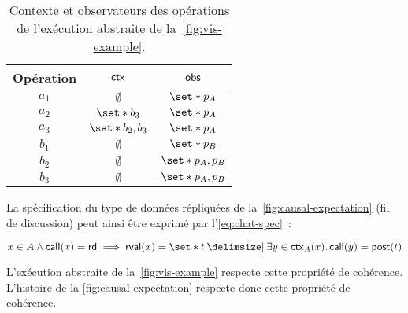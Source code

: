 \begin{table}[htb]
    \centering
    \begin{tabular}{ccc}
        Opération & $\operatorname{\mathsf{ctx}}$ & $\operatorname{\mathsf{obs}}$ \\
        \toprule
        $a_1$ & $\emptyset$ & $\set*{p_A}$ \\
        $a_2$ & $\set*{b_3}$ & $\set*{p_A}$ \\
        $a_3$ & $\set*{b_2, b_3}$ & $\set*{p_A}$ \\
        $b_1$ & $\emptyset$ & $\set*{p_B}$ \\
        $b_2$ & $\emptyset$ & $\set*{p_A, p_B}$ \\
        $b_3$ & $\emptyset$ & $\set*{p_A, p_B}$ \\
    \end{tabular}
    \caption{Contexte et observateurs des opérations de l'exécution abstraite de la~\autoref{fig:vis-example}.}\label{tab:op-ctx-obs}
\end{table}

La spécification du type de données répliquées de la~\autoref{fig:causal-expectation} (fil de discussion) peut ainsi être exprimé par l'\autoref{eq:chat-spec}~:

\begin{equation}\label{eq:chat-spec}
    x \in A \land \trm{call}(x) = \trm{rd} \implies \trm{rval}(x) = \set*{t \given \exists y \in \trm{ctx}_A(x) \qsep \trm{call}(y) = \trm{post}(t)}
\end{equation}

L'exécution abstraite de la~\autoref{fig:vis-example} respecte cette propriété de cohérence.
L'histoire de la \autoref{fig:causal-expectation} respecte donc cette propriété de cohérence.



